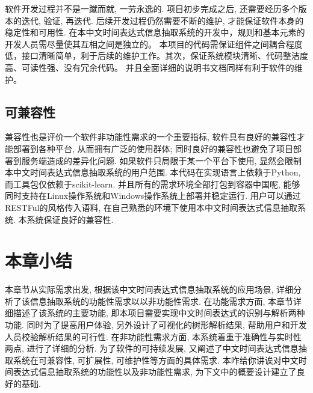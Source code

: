 软件开发过程并不是一蹴而就, 一劳永逸的. 项目初步完成之后, 还需要经历多个版本的迭代, 验证, 再迭代. 
后续开发过程仍然需要不断的维护, 才能保证软件本身的稳定性和可用性.
在本中文时间表达式信息抽取系统的开发中，规则和基本元素的开发人员需尽量使其互相之间是独立的。
本项目的代码需保证组件之间耦合程度低，接口清晰简单，利于后续的维护工作。其次，保证系统模块清晰、代码整洁度高、可读性强、没有冗余代码。
并且全面详细的说明书文档同样有利于软件的维护。

\subsection{可兼容性}

兼容性也是评价一个软件非功能性需求的一个重要指标, 软件具有良好的兼容性才能部署到各种平台, 从而拥有广泛的使用群体; 同时良好的兼容性也避免了项目部署到服务端造成的差异化问题.
如果软件只局限于某一个平台下使用, 显然会限制本中文时间表达式信息抽取系统的用户范围. 本代码在实现语言上依赖于Python, 而工具包仅依赖于scikit-learn. 
并且所有的需求环境全部打包到容器中国呢, 能够同时支持在Linux操作系统和Windows操作系统上部署并稳定运行. 
用户可以通过RESTFul的风格传入语料, 在自己熟悉的环境下使用本中文时间表达式信息抽取系统. 本系统保证良好的兼容性.

\section{本章小结}

本章节从实际需求出发, 根据该中文时间表达式信息抽取系统的应用场景, 详细分析了该信息抽取系统的功能性需求以以非功能性需求.
在功能需求方面, 本章节详细描述了该系统的主要功能, 即本项目需要实现中文时间表达式的识别与解析两种功能. 
同时为了提高用户体验, 另外设计了可视化的树形解析结果, 帮助用户和开发人员校验解析结果的可行性.
在非功能性需求方面, 本系统着重于准确性与实时性两点, 进行了详细的分析. 
为了软件的可持续发展, 又阐述了中文时间表达式信息抽取系统在可兼容性, 可扩展性, 可维护性等方面的具体需求.
本咋给你讲诶对中文时间表达式信息抽取系统的功能性以及非功能性需求, 为下文中的概要设计建立了良好的基础.

